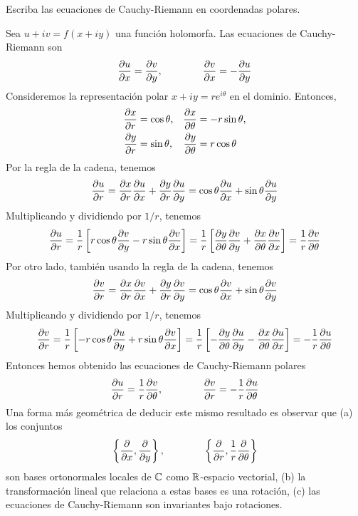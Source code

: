 \begin{exercise}
Escriba las ecuaciones de Cauchy-Riemann en coordenadas polares.
\end{exercise}

\begin{solution}
Sea $u + iv = f(x + iy)$ una función holomorfa. Las ecuaciones de Cauchy-Riemann son
$$\p ux = \p vy, \qquad \qquad \p vx = -\p uy$$
Consideremos la representación polar $x + iy = re^{i\theta}$ en el dominio. Entonces,
\begin{align*}
    \p xr &= \cos \theta, & \p x \theta &= -r \sin \theta, \\
    \p yr &= \sin \theta, & \p y \theta &= r \cos \theta
\end{align*}
Por la regla de la cadena, tenemos
$$\p ur = \p xr \p ux + \p yr \p uy = \cos \theta \p ux + \sin \theta \p uy$$
Multiplicando y dividiendo por $1/r$, tenemos
$$
\p ur
    = \frac 1r \left[ r \cos \theta \p vy - r \sin \theta \p vx \right]
    = \frac 1r \left[ \p y \theta \p vy + \p x \theta \p vx \right]
    = \frac 1r \p v \theta
$$
Por otro lado, también usando la regla de la cadena, tenemos
$$\p vr = \p xr \p vx + \p yr \p vy = \cos \theta \p vx + \sin \theta \p vy$$
Multiplicando y dividiendo por $1/r$, tenemos
$$
\p vr
    = \frac 1r \left[ -r \cos \theta \p uy + r \sin \theta \p vx \right]
    = \frac 1r \left[ -\p y \theta \p uy - \p x \theta \p ux \right]
    = -\frac 1r \p u \theta
$$
Entonces hemos obtenido las ecuaciones de Cauchy-Riemann polares
$$\p ur = \frac 1r \p v \theta, \qquad \qquad \p vr = -\frac 1r \p u \theta$$
Una forma más geométrica de deducir este mismo resultado es observar que (a) los conjuntos
$$\left \{ \p {} x, \p {} y \right \}, \qquad \qquad \left \{ \p {} r, \frac 1r \p {} \theta \right \}$$
son bases ortonormales locales de $\C$ como $\R$-espacio vectorial, (b) la transformación lineal que relaciona a estas bases es una rotación, (c) las ecuaciones de Cauchy-Riemann son invariantes bajo rotaciones.
\end{solution}
